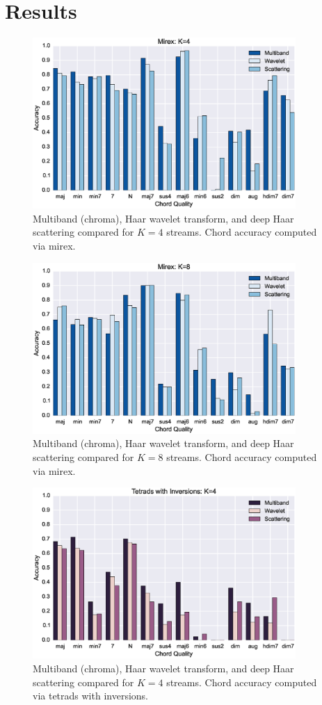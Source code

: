 \documentclass{article}
\begin{document}
\section{Results}\label{sec:results}

\begin{figure}
 \centerline{
 \includegraphics[width=10cm]{figs/mirex4.eps}}
 \caption{Multiband (chroma), Haar wavelet transform, and deep Haar scattering compared for $K=4$ streams. Chord accuracy computed via mirex.}
 \label{fig:mirex4}
\end{figure}

\begin{figure}
 \centerline{
 \includegraphics[width=10cm]{figs/mirex8.eps}}
 \caption{Multiband (chroma), Haar wavelet transform, and deep Haar scattering compared for $K=8$ streams. Chord accuracy computed via mirex.}
 \label{fig:mirex8}
\end{figure}

\begin{figure}
 \centerline{
 \includegraphics[width=10cm]{figs/tetrad_inv4.eps}}
 \caption{Multiband (chroma), Haar wavelet transform, and deep Haar scattering compared for $K=4$ streams. Chord accuracy computed via tetrads with inversions.}
 \label{fig:tetrad4}
\end{figure}
\end{document}
